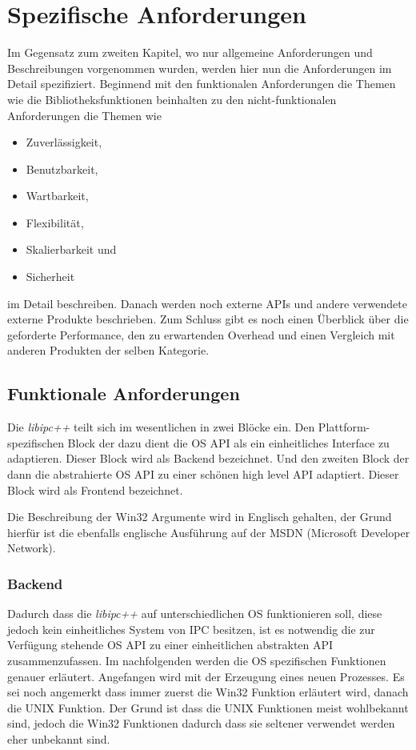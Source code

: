 \documentclass[a4paper]{book}
\begin{document}
\chapter{Spezifische Anforderungen}
Im Gegensatz zum zweiten Kapitel, wo nur allgemeine Anforderungen und Beschreibungen vorgenommen wurden, werden hier nun die Anforderungen im Detail spezifiziert. Beginnend mit den funktionalen Anforderungen die Themen wie die Bibliotheksfunktionen beinhalten zu den nicht-funktionalen Anforderungen die Themen wie
\begin{itemize}
\item Zuverlässigkeit,
\item Benutzbarkeit,
\item Wartbarkeit,
\item Flexibilität,
\item Skalierbarkeit und
\item Sicherheit
\end{itemize}
im Detail beschreiben. Danach werden noch externe APIs und andere verwendete externe Produkte beschrieben. Zum Schluss gibt es noch einen Überblick über die geforderte Performance, den zu erwartenden Overhead und einen Vergleich mit anderen Produkten der selben Kategorie.

\section{Funktionale Anforderungen}
Die \textit{libipc++} teilt sich im wesentlichen in zwei Blöcke ein. Den Plattform-spezifischen Block der dazu dient die OS API als ein einheitliches Interface zu adaptieren. Dieser Block wird als Backend bezeichnet. Und den zweiten Block der dann die abstrahierte OS API zu einer schönen high level API adaptiert. Dieser Block wird als Frontend bezeichnet.\newline

\noindent Die Beschreibung der Win32 Argumente wird in Englisch gehalten, der Grund hierfür ist die ebenfalls englische Ausführung auf der MSDN (Microsoft Developer Network).

\subsection{Backend}
Dadurch dass die \textit{libipc++} auf unterschiedlichen OS funktionieren soll, diese jedoch kein einheitliches System von IPC besitzen, ist es notwendig die zur Verfügung stehende OS API zu einer einheitlichen abstrakten API zusammenzufassen. Im nachfolgenden werden die OS spezifischen Funktionen genauer erläutert. Angefangen wird mit der Erzeugung eines neuen Prozesses. Es sei noch angemerkt dass immer zuerst die Win32 Funktion erläutert wird, danach die UNIX Funktion. Der Grund ist dass die UNIX Funktionen meist wohlbekannt sind, jedoch die Win32 Funktionen dadurch dass sie seltener verwendet werden eher unbekannt sind.\newline
\end{document}

